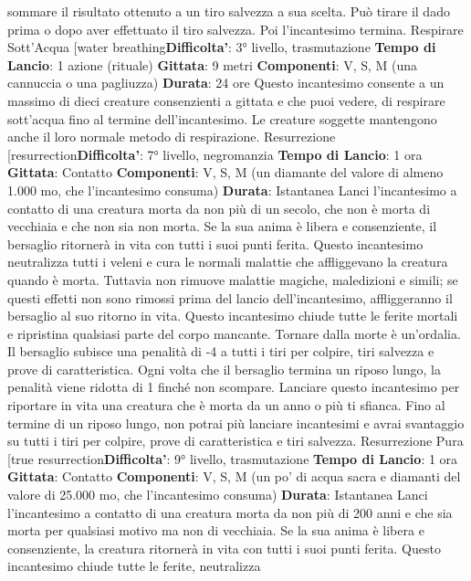 \begin{multicols}{2}
sommare il risultato ottenuto a un tiro salvezza a sua
scelta. Può tirare il dado prima o dopo aver effettuato il
tiro salvezza. Poi l’incantesimo termina.
Respirare Sott’Acqua
[water breathing\textbf{Difficolta'}:
3° livello, trasmutazione
\textbf{Tempo di Lancio}: 1 azione (rituale)
\textbf{Gittata}: 9 metri
\textbf{Componenti}: V, S, M (una cannuccia o una pagliuzza)
\textbf{Durata}: 24 ore
Questo incantesimo consente a un massimo di dieci
creature consenzienti a gittata e che puoi vedere, di
respirare sott’acqua fino al termine dell’incantesimo. Le
creature soggette mantengono anche il loro normale
metodo di respirazione.
Resurrezione
[resurrection\textbf{Difficolta'}:
7° livello, negromanzia
\textbf{Tempo di Lancio}: 1 ora
\textbf{Gittata}: Contatto
\textbf{Componenti}: V, S, M (un diamante del valore di
almeno 1.000 mo, che l’incantesimo consuma)
\textbf{Durata}: Istantanea
Lanci l’incantesimo a contatto di una creatura morta da
non più di un secolo, che non è morta di vecchiaia e
che non sia non morta. Se la sua anima è libera e
consenziente, il bersaglio ritornerà in vita con tutti i suoi
punti ferita.
Questo incantesimo neutralizza tutti i veleni e cura le
normali malattie che affliggevano la creatura quando è
morta. Tuttavia non rimuove malattie magiche,
maledizioni e simili; se questi effetti non sono rimossi
prima del lancio dell’incantesimo, affliggeranno il
bersaglio al suo ritorno in vita.
Questo incantesimo chiude tutte le ferite mortali e
ripristina qualsiasi parte del corpo mancante.
Tornare dalla morte è un’ordalia. Il bersaglio subisce
una penalità di -4 a tutti i tiri per colpire, tiri salvezza e
prove di caratteristica. Ogni volta che il bersaglio
termina un riposo lungo, la penalità viene ridotta di 1
finché non scompare.
Lanciare questo incantesimo per riportare in vita una
creatura che è morta da un anno o più ti sfianca. Fino al
termine di un riposo lungo, non potrai più lanciare
incantesimi e avrai svantaggio su tutti i tiri per colpire,
prove di caratteristica e tiri salvezza.
Resurrezione Pura
[true resurrection\textbf{Difficolta'}:
9° livello, trasmutazione
\textbf{Tempo di Lancio}: 1 ora
\textbf{Gittata}: Contatto
\textbf{Componenti}: V, S, M (un po’ di acqua sacra e diamanti
del valore di 25.000 mo, che l’incantesimo consuma)
\textbf{Durata}: Istantanea
Lanci l’incantesimo a contatto di una creatura morta da
non più di 200 anni e che sia morta per qualsiasi motivo
ma non di vecchiaia. Se la sua anima è libera e
consenziente, la creatura ritornerà in vita con tutti i suoi
punti ferita.
Questo incantesimo chiude tutte le ferite, neutralizza

\end{multicols}
